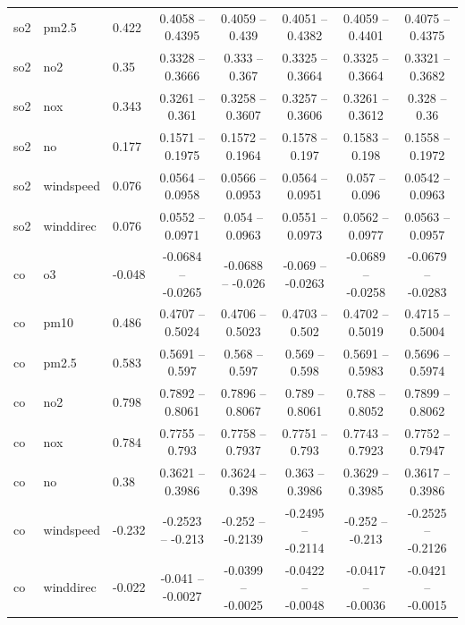 \documentclass{beamer}
\begin{document}
\begin{frame}
{\begin{tabular}{lllccccc}
      so2       & pm2.5     & 0.422  & 0.4058  -- 0.4395  & 0.4059  -- 0.439   & 0.4051  -- 0.4382  & 0.4059  -- 0.4401  & 0.4075  -- 0.4375 \\
      so2       & no2       & 0.35   & 0.3328  -- 0.3666  & 0.333   -- 0.367   & 0.3325  -- 0.3664  & 0.3325  -- 0.3664  & 0.3321  -- 0.3682 \\
      so2       & nox       & 0.343  & 0.3261  -- 0.361   & 0.3258  -- 0.3607  & 0.3257  -- 0.3606  & 0.3261  -- 0.3612  & 0.328   -- 0.36   \\
      so2       & no        & 0.177  & 0.1571  -- 0.1975  & 0.1572  -- 0.1964  & 0.1578  -- 0.197   & 0.1583  -- 0.198   & 0.1558  -- 0.1972 \\
      so2       & windspeed & 0.076  & 0.0564  -- 0.0958  & 0.0566  -- 0.0953  & 0.0564  -- 0.0951  & 0.057   -- 0.096   & 0.0542  -- 0.0963 \\
      so2       & winddirec & 0.076  & 0.0552  -- 0.0971  & 0.054   -- 0.0963  & 0.0551  -- 0.0973  & 0.0562  -- 0.0977  & 0.0563  -- 0.0957 \\
      co        & o3        & -0.048 & -0.0684 -- -0.0265 & -0.0688 -- -0.026  & -0.069  -- -0.0263 & -0.0689 -- -0.0258 & -0.0679 -- -0.0283 \\
      co        & pm10      & 0.486  & 0.4707  -- 0.5024  & 0.4706  -- 0.5023  & 0.4703  -- 0.502   & 0.4702  -- 0.5019  & 0.4715  -- 0.5004 \\
      co        & pm2.5     & 0.583  & 0.5691  -- 0.597   & 0.568   -- 0.597   & 0.569   -- 0.598   & 0.5691  -- 0.5983  & 0.5696  -- 0.5974 \\
      co        & no2       & 0.798  & 0.7892  -- 0.8061  & 0.7896  -- 0.8067  & 0.789   -- 0.8061  & 0.788   -- 0.8052  & 0.7899  -- 0.8062 \\
      co        & nox       & 0.784  & 0.7755  -- 0.793   & 0.7758  -- 0.7937  & 0.7751  -- 0.793   & 0.7743  -- 0.7923  & 0.7752  -- 0.7947 \\
      co        & no        & 0.38   & 0.3621  -- 0.3986  & 0.3624  -- 0.398   & 0.363   -- 0.3986  & 0.3629  -- 0.3985  & 0.3617  -- 0.3986  \\
      co        & windspeed & -0.232 & -0.2523 -- -0.213  & -0.252  -- -0.2139 & -0.2495 -- -0.2114 & -0.252  -- -0.213  & -0.2525 -- -0.2126 \\
      co        & winddirec & -0.022 & -0.041  -- -0.0027 & -0.0399 -- -0.0025 & -0.0422 -- -0.0048 & -0.0417 -- -0.0036 & -0.0421 -- -0.0015 \\
    \end{tabular}
  }
\end{frame}
\end{document}
